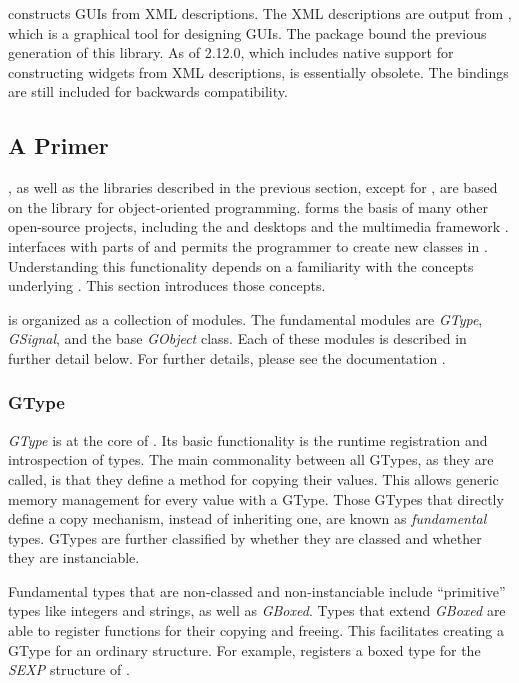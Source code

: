 \documentclass[article]{jss}
\begin{document}
 constructs  GUIs from XML descriptions.
The XML descriptions are output from
, which is a graphical tool for designing GUIs. The 
package \citep{RGtkGlade} bound the previous generation of this library. As of 
 2.12.0, which includes native support for constructing widgets from 
XML descriptions,  is essentially obsolete. The bindings are
still included for backwards compatibility.

\subsection[A GObject Primer]{A  Primer}\label{sec:primer}

, as well as the libraries described in the previous section,
except for , are based on the  library for 
object-oriented programming.  forms the basis of many other 
open-source projects, including the  \citep{GTK} and  
\citep{xfce} desktops and the  multimedia framework \citep{gstreamer}.
 interfaces with parts of  and permits the  
programmer to create new  classes in . Understanding 
this functionality depends on a familiarity with the concepts underlying 
. This section introduces those concepts.

 is organized as a collection of modules. The fundamental
modules are \emph{GType}, \emph{GSignal}, and the base
\emph{GObject} class. Each of these modules is described in further detail below. 
For further details, please see the  documentation \citep{gobject}.

\subsubsection{GType}

\emph{GType} is at the core of . Its basic functionality is the 
runtime registration and introspection of types. The
main commonality between all GTypes, as they are called, is that they define
a method for copying their values. This allows generic memory management for
every value with a GType. Those GTypes that directly define a copy mechanism,
instead of inheriting one, are known as \emph{fundamental} types.
GTypes are further classified by whether they are classed and whether they are
instanciable. 

Fundamental types that are non-classed and non-instanciable 
include ``primitive'' types like integers and strings, as well as \emph{GBoxed}.
Types that extend \emph{GBoxed} are able to register functions for their
copying and freeing. This facilitates creating a GType for an ordinary 
 structure. For example,  registers a boxed type for 
the \emph{SEXP} structure of . 
\end{document}
